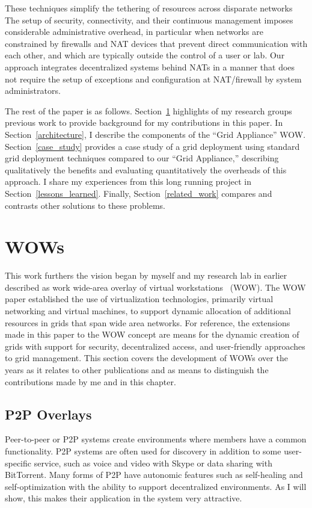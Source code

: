 These techniques simplify the tethering of resources across disparate networks
The setup of security, connectivity, and their continuous management imposes
considerable administrative overhead, in particular when networks are
constrained by firewalls and NAT devices that prevent direct communication with
each other, and which are typically outside the control of a user or lab.  Our
approach integrates decentralized systems behind NATs in a manner that does not
require the setup of exceptions and configuration at NAT/firewall by system
administrators.

The rest of the paper is as follows.  Section~\ref{wow} highlights of my
research groups previous work to provide background for my contributions in
this paper.  In Section~\ref{architecture}, I describe the components of the
``Grid Appliance'' WOW.  Section~\ref{case_study} provides a case study of a
grid deployment using standard grid deployment techniques compared to our
``Grid Appliance,'' describing qualitatively the benefits and evaluating
quantitatively the overheads of this approach.  I share my experiences from
this long running project in Section~\ref{lessons_learned}.  Finally,
Section~\ref{related_work} compares and contrasts other solutions to these
problems.

\section{WOWs}
\label{wow}

This work furthers the vision began by myself and my research lab in earlier
described as work wide-area overlay of virtual workstations~\cite{wow} (WOW).
The WOW paper established the use of virtualization technologies, primarily
virtual networking and virtual machines, to support dynamic allocation of
additional resources in grids that span wide area networks.  For reference, the
extensions made in this paper to the WOW concept are means for the dynamic
creation of grids with support for security, decentralized access, and
user-friendly approaches to grid management.  This section covers the
development of WOWs over the years as it relates to other publications and as
means to distinguish the contributions made by me and in this chapter.

\subsection{P2P Overlays}

Peer-to-peer or P2P systems create environments where members have a common
functionality.  P2P systems are often used for discovery in addition to some
user-specific service, such as voice and video with Skype or data sharing with
BitTorrent.  Many forms of P2P have autonomic features such as self-healing and
self-optimization with the ability to support decentralized environments.  As I
will show, this makes their application in the system very attractive.

